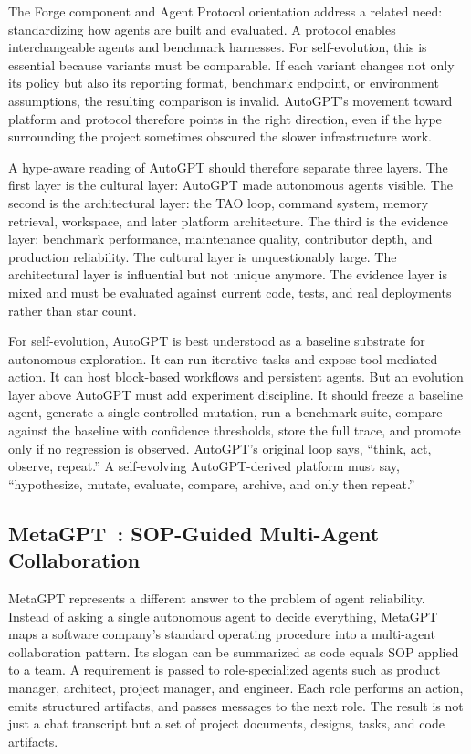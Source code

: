 The Forge component and Agent Protocol orientation address a related need: standardizing how agents are built and evaluated.  A protocol enables interchangeable agents and benchmark harnesses.  For self-evolution, this is essential because variants must be comparable.  If each variant changes not only its policy but also its reporting format, benchmark endpoint, or environment assumptions, the resulting comparison is invalid.  AutoGPT's movement toward platform and protocol therefore points in the right direction, even if the hype surrounding the project sometimes obscured the slower infrastructure work.

A hype-aware reading of AutoGPT should therefore separate three layers.  The first layer is the cultural layer: AutoGPT made autonomous agents visible.  The second is the architectural layer: the TAO loop, command system, memory retrieval, workspace, and later platform architecture.  The third is the evidence layer: benchmark performance, maintenance quality, contributor depth, and production reliability.  The cultural layer is unquestionably large.  The architectural layer is influential but not unique anymore.  The evidence layer is mixed and must be evaluated against current code, tests, and real deployments rather than star count.

For self-evolution, AutoGPT is best understood as a baseline substrate for autonomous exploration.  It can run iterative tasks and expose tool-mediated action.  It can host block-based workflows and persistent agents.  But an evolution layer above AutoGPT must add experiment discipline.  It should freeze a baseline agent, generate a single controlled mutation, run a benchmark suite, compare against the baseline with confidence thresholds, store the full trace, and promote only if no regression is observed.  AutoGPT's original loop says, ``think, act, observe, repeat.''  A self-evolving AutoGPT-derived platform must say, ``hypothesize, mutate, evaluate, compare, archive, and only then repeat.''

\subsection{MetaGPT~\cite{metagpt2023}: SOP-Guided Multi-Agent Collaboration}
\label{subsec:metagpt}

MetaGPT represents a different answer to the problem of agent reliability.  Instead of asking a single autonomous agent to decide everything, MetaGPT maps a software company's standard operating procedure into a multi-agent collaboration pattern.  Its slogan can be summarized as code equals SOP applied to a team.  A requirement is passed to role-specialized agents such as product manager, architect, project manager, and engineer.  Each role performs an action, emits structured artifacts, and passes messages to the next role.  The result is not just a chat transcript but a set of project documents, designs, tasks, and code artifacts.

